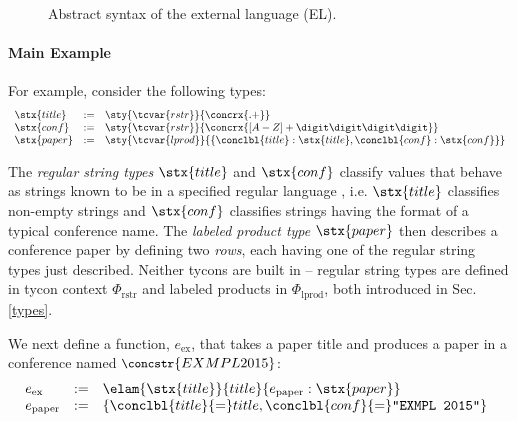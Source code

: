 \begin{figure}[t]
\small
\hspace{-5px}
\caption{Abstract syntax of the external language (EL).}
\label{syntax-EL}
\end{figure}

\paragraph{Main Example} For example, consider the following types:
\[\begin{array}{lcl}
\stx{title} & := & \sty{\tcvar{rstr}}{\concrx{.+}}\\
\stx{conf} & := & \sty{\tcvar{rstr}}{\concrx{[A-Z]+ \digit\digit\digit\digit}}\\
\stx{paper} & := & \sty{\tcvar{lprod}}{\{\conclbl{title} : \stx{title}, \conclbl{conf} : \stx{conf}\}}\end{array}\]

The \emph{regular string types} $\stx{title}$ and $\stx{conf}$ classify values that behave as strings known to be in a specified regular language \cite{sanitation-psp14}, i.e. $\stx{title}$ classifies {non-empty strings} and $\stx{conf}$ classifies strings having the format of a typical conference name. The \emph{labeled product type} $\stx{paper}$ then describes a conference paper by defining two \emph{rows}, each having one of the regular string types just described. Neither tycons are built in -- regular string types are defined in  tycon context $\Phi_\text{rstr}$ and labeled products in $\Phi_\text{lprod}$, both introduced in Sec. \ref{types}.%

We next define a function, $e_\text{ex}$, that takes a paper title and produces a paper in a conference named $\small\concstr{EXMPL 2015}$: %
\[\hspace{-5px}\begin{array}{lcl}
e_\text{ex} & := & \elam{\stx{title}}{title}{e_\text{paper} : \stx{paper}}\\
e_\text{paper} & := & \{\conclbl{title}{=}title, \conclbl{conf}{=}\texttt{"EXMPL 2015"}\}
\end{array}\]

